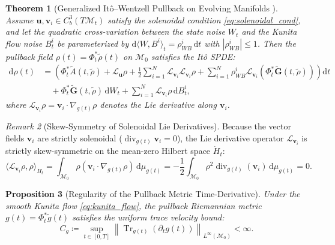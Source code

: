 \documentclass[11pt,a4paper,reqno]{article}
\DeclareMathOperator{\Tr}{Tr}
\theoremstyle{plain}
\newtheorem{theorem}{Theorem}[section]
\newtheorem{proposition}[theorem]{Proposition}
\theoremstyle{definition}
\theoremstyle{remark}
\newtheorem{remark}[theorem]{Remark}
\numberwithin{equation}{section}
\begin{document}
\begin{theorem}[Generalized It\^o--Wentzell Pullback on Evolving Manifolds \cite{ananda2026stochastic_fluid_v2, krylov2011ito}]\label{thm:ito_wentzell}
Assume $\mathbf{u}, \mathbf{v}_i \in C_b^3(T\mathcal{M}_t)$ satisfy the solenoidal condition \eqref{eq:solenoidal_cond}, and let the quadratic cross-variation between the state noise $W_t$ and the Kunita flow noise $B_t^i$ be parameterized by $\mathrm{d}\langle W, B^i \rangle_t = \rho_{WB}^i\,\mathrm{d}t$ with $|\rho_{WB}^i| \le 1$. Then the pullback field $\rho(t) = \Phi_t^*\tilde{\rho}(t)$ on $\mathcal{M}_0$ satisfies the It\^o SPDE:
\begin{align}\label{eq:ito_wentzell_pullback}
  \mathrm{d}\rho(t) &= \left( \Phi_t^* \tilde{A}(t, \tilde{\rho}) + \mathcal{L}_{\mathbf{u}} \rho + \frac{1}{2} \sum_{i=1}^N \mathcal{L}_{\mathbf{v}_i} \mathcal{L}_{\mathbf{v}_i} \rho + \sum_{i=1}^N \rho_{WB}^i \mathcal{L}_{\mathbf{v}_i} \left(\Phi_t^* \tilde{\mathbf{G}}(t, \tilde{\rho})\right) \right) \mathrm{d}t \nonumber \\
  &\quad + \Phi_t^* \tilde{\mathbf{G}}(t, \tilde{\rho})\,\mathrm{d}W_t + \sum_{i=1}^N \mathcal{L}_{\mathbf{v}_i} \rho \,\mathrm{d}B_t^i,
\end{align}
where $\mathcal{L}_{\mathbf{v}_i}\rho = \mathbf{v}_i \cdot \nabla_{g(t)}\rho$ denotes the Lie derivative along $\mathbf{v}_i$.
\end{theorem}

\begin{remark}[Skew-Symmetry of Solenoidal Lie Derivatives]\label{rem:skew_symmetry}
Because the vector fields $\mathbf{v}_i$ are strictly solenoidal ($\operatorname{div}_{g(t)} \mathbf{v}_i = 0$), the Lie derivative operator $\mathcal{L}_{\mathbf{v}_i}$ is strictly skew-symmetric on the mean-zero Hilbert space $\dot{H}_t$:
\begin{equation}\label{eq:skew_symmetry}
  \langle \mathcal{L}_{\mathbf{v}_i} \rho, \rho \rangle_{\dot{H}_t}
  = \int_{\mathcal{M}_0} \rho (\mathbf{v}_i \cdot \nabla_{g(t)} \rho) \,\mathrm{d}\mu_{g(t)}
  = -\frac{1}{2} \int_{\mathcal{M}_0} \rho^2 \operatorname{div}_{g(t)}(\mathbf{v}_i) \,\mathrm{d}\mu_{g(t)} = 0.
\end{equation}
\end{remark}

\begin{proposition}[Regularity of the Pullback Metric Time-Derivative]\label{prop:metric_trace_bound}
Under the smooth Kunita flow \eqref{eq:kunita_flow}, the pullback Riemannian metric $g(t) = \Phi_t^*\tilde{g}(t)$ satisfies the uniform trace velocity bound:
\begin{equation}\label{eq:metric_cg_bound}
  C_g \coloneqq \sup_{t \in [0,T]} \left\| \Tr_{g(t)}\!\left(\partial_t g(t)\right) \right\|_{L^\infty(\mathcal{M}_0)} < \infty.
\end{equation}
\end{proposition}
\end{document}
